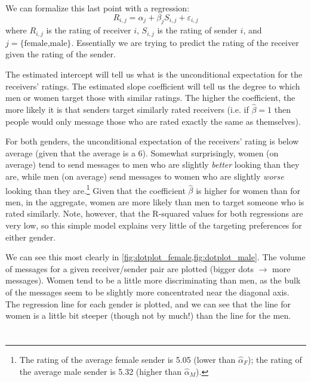 We can formalize this last point with a regression:
\[ R_{i,j} = \alpha_j + \beta_j S_{i,j} + \varepsilon_{i,j} \]
where $R_{i,j}$ is the rating of receiver $i$, $S_{i,j}$ is the rating of sender $i$, and $j=\text{\{female,male\}}$. Essentially we are trying to predict the rating of the receiver given the rating of the sender.

The estimated intercept will tell us what is the unconditional expectation for the receivers' ratings. The estimated slope coefficient will tell us the degree to which men or women target those with similar ratings. The higher the coefficient, the more likely it is that senders target similarly rated receivers (i.e. if $\hat{\beta}=1$ then people would only message those who are rated exactly the same as themselves).



For both genders, the unconditional expectation of the receivers' rating is below average (given that the average is a 6). Somewhat surprisingly, women (on average) tend to send messages to men who are slightly \textit{better} looking than they are, while men (on average) send messages to women who are slightly \textit{worse} looking than they are.\footnote{The rating of the average female sender is 5.05 (lower than $\hat{\alpha}_{F}$); the rating of the average male sender is 5.32 (higher than $\hat{\alpha}_{M}$).} Given that the coefficient $\hat{\beta}$ is higher for women than for men, in the aggregate, women are more likely than men to target someone who is rated similarly. Note, however, that the R-squared values for both regressions are very low, so this simple model explains very little of the targeting preferences for either gender.

We can see this most clearly in \vref{fig:dotplot_female,fig:dotplot_male}. The volume of messages for a given receiver/sender pair are plotted (bigger dots $\rightarrow$ more messages). Women tend to be a little more discriminating than men, as the bulk of the messages seem to be slightly more concentrated near the diagonal axis. The regression line for each gender is plotted, and we can see that the line for women is a little bit steeper (though not by much!) than the line for the men.




\section{}


